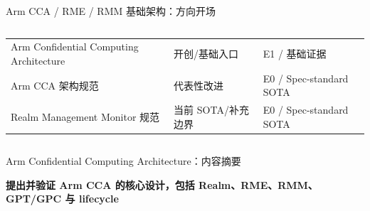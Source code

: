 \begin{frame}[t,shrink=6]{Arm CCA / RME / RMM 基础架构：方向开场}
\begin{columns}[T,totalwidth=\textwidth]
\begin{column}{0.49\textwidth}
{\begin{minipage}[t]{0.97\linewidth}
\begin{minipage}{0.92\linewidth}
{\begin{tabularx}{\linewidth}{@{}YYY@{}}
\midrule
Arm Confidential Computing Architecture & 开创/基础入口 & E1 / 基础证据 \\
Arm CCA 架构规范 & 代表性改进 & E0 / Spec-standard SOTA \\
Realm Management Monitor 规范 & 当前 SOTA/补充边界 & E0 / Spec-standard SOTA \\
\bottomrule
\end{tabularx}
}
    \end{minipage}
    \vspace{1mm}
  \end{minipage}}
  \end{column}
\end{columns}
\end{frame}


\begin{frame}[t,shrink=6]{Arm Confidential Computing Architecture：内容摘要}
{\large\bfseries\color{Ink} 提出并验证 Arm CCA 的核心设计，包括 Realm、RME、RMM、GPT/GPC 与 lifecycle\par}\vspace{1.2mm}
\begin{columns}[T,totalwidth=\textwidth]
  \begin{column}{0.45\textwidth}
  \end{column}
  \begin{column}{0.49\textwidth}
\end{column}
\end{columns}
\end{frame}
